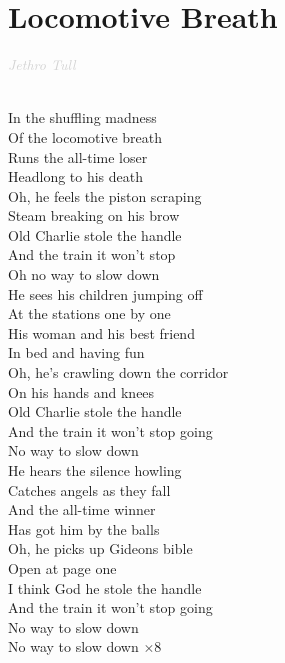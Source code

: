 \documentclass[a5paper, 10pt]{book}
\begin{document}
\section{Locomotive Breath}\textcolor{lightgray}{\textit{Jethro Tull}}\\~\\
\begin{minipage}[t]{0.8\textwidth}
In the shuffling madness\\
Of the locomotive breath\\
Runs the all-time loser\\
Headlong to his death\\
Oh, he feels the piston scraping\\
Steam breaking on his brow\\
Old Charlie stole the handle\\
And the train it won't stop\\
Oh no way to slow down\\

He sees his children jumping off\\
At the stations one by one\\
His woman and his best friend\\
In bed and having fun\\
Oh, he's crawling down the corridor\\
On his hands and knees\\
Old Charlie stole the handle\\
And the train it won't stop going\\
No way to slow down\\

He hears the silence howling\\
Catches angels as they fall\\
And the all-time winner\\
Has got him by the balls\\
Oh, he picks up Gideons bible\\
Open at page one\\
I think God he stole the handle\\
And the train it won't stop going\\
No way to slow down\\

No way to slow down \hspace*{10mm}$\times$8\\
\end{minipage}
\end{document}
